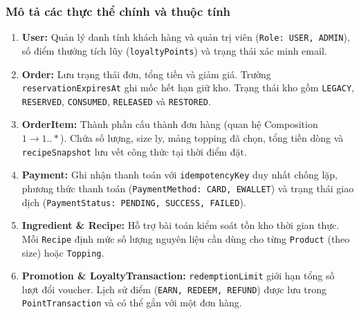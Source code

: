 \subsubsection{Mô tả các thực thể chính và thuộc tính}
\begin{enumerate}[leftmargin=2.2em]
  \item \textbf{User:} Quản lý danh tính khách hàng và quản trị viên (\texttt{Role: USER, ADMIN}), số điểm thưởng tích lũy (\texttt{loyaltyPoints}) và trạng thái xác minh email.
  \item \textbf{Order:} Lưu trạng thái đơn, tổng tiền và giảm giá. Trường \texttt{reservationExpiresAt} ghi mốc hết hạn giữ kho. Trạng thái kho gồm \texttt{LEGACY}, \texttt{RESERVED}, \texttt{CONSUMED}, \texttt{RELEASED} và \texttt{RESTORED}.
  \item \textbf{OrderItem:} Thành phần cấu thành đơn hàng (quan hệ Composition $1 \longrightarrow 1..*$). Chứa số lượng, size ly, mảng topping đã chọn, tổng tiền dòng và \texttt{recipeSnapshot} lưu vết công thức tại thời điểm đặt.
  \item \textbf{Payment:} Ghi nhận thanh toán với \texttt{idempotencyKey} duy nhất chống lặp, phương thức thanh toán (\texttt{PaymentMethod: CARD, EWALLET}) và trạng thái giao dịch (\texttt{PaymentStatus: PENDING, SUCCESS, FAILED}).
  \item \textbf{Ingredient \& Recipe:} Hỗ trợ bài toán kiểm soát tồn kho thời gian thực. Mỗi \texttt{Recipe} định mức số lượng nguyên liệu cần dùng cho từng \texttt{Product} (theo size) hoặc \texttt{Topping}.
  \item \textbf{Promotion \& LoyaltyTransaction:} \texttt{redemptionLimit} giới hạn tổng số lượt đổi voucher. Lịch sử điểm (\texttt{EARN, REDEEM, REFUND}) được lưu trong \texttt{PointTransaction} và có thể gắn với một đơn hàng.
\end{enumerate}

